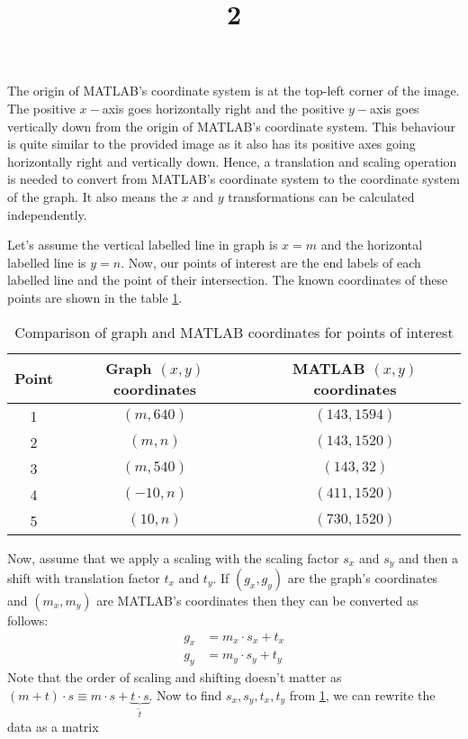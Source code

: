 \documentclass[a4paper]{article}
\title{2}
\date{}
\begin{document}
\maketitle
The origin of MATLAB's coordinate system is at the top-left corner of the image. The positive $x-$axis goes horizontally right and the positive $y-$axis goes vertically down from the origin of MATLAB's coordinate system. This behaviour is quite similar to the provided image as it also has its positive axes going horizontally right and vertically down. Hence, a translation and scaling operation is needed to convert from MATLAB's coordinate system to the coordinate system of the graph. It also means the $x$ and $y$ transformations can be calculated independently.

Let's assume the vertical labelled line in graph is $x=m$ and the horizontal labelled line is $y=n$. Now, our points of interest are the end labels of each labelled line and the point of their intersection. The known coordinates of these points are shown in the table \ref{tab:poi}.
\begin{table}[H]
\centering
\begin{tabular}{ccc}
	Point & Graph $(x,y)$ coordinates & MATLAB $(x,y)$ coordinates\\\hline
	1 & $(m, 640)$ & $(143, 1594)$\\
	2 & $(m, n)$ & $(143, 1520)$\\
	3 & $(m, 540)$ & $(143, 32)$\\
	4 & $(-10, n)$ & $(411, 1520)$\\
	5 & $(10, n)$ & $(730, 1520)$
\end{tabular}
\caption{Comparison of graph and MATLAB coordinates for points of interest}
\label{tab:poi}
\end{table}
Now, assume that we apply a scaling with the scaling factor $s_x$ and $s_y$ and then a shift with translation factor $t_x$ and $t_y$. If $(g_x, g_y)$ are the graph's coordinates and $(m_x, m_y)$ are MATLAB's coordinates then they can be converted as follows:
\begin{equation}
	\begin{aligned}
		g_x &= m_x \cdot s_x + t_x\\
		g_y &= m_y \cdot s_y + t_y
	\end{aligned}
\end{equation}
Note that the order of scaling and shifting doesn't matter as $(m + t) \cdot s \equiv m \cdot s + \underbrace{t \cdot s}_{\tilde{t}}$. 
Now to find $s_x, s_y, t_x, t_y$ from \ref{tab:poi}, we can rewrite the data as a matrix
\end{document}
